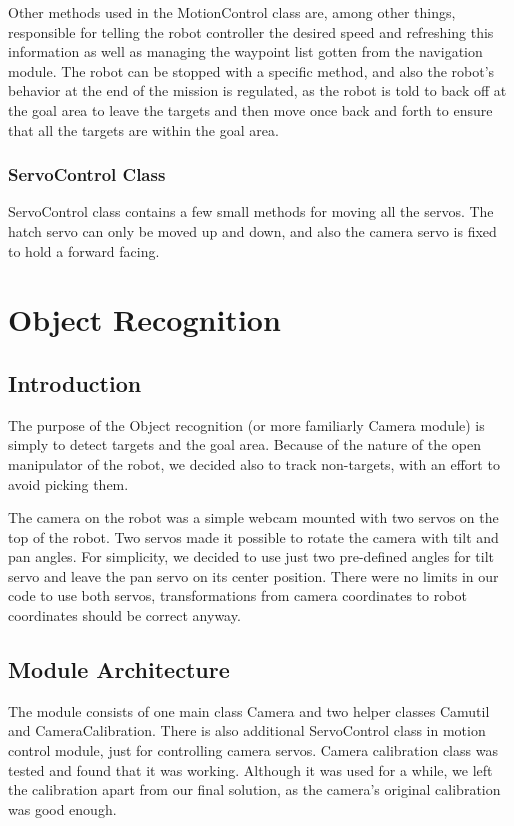 \documentclass[a4paper,10pt]{article}
\begin{document}
Other methods used in the MotionControl class are, among other things, responsible for telling the robot controller the desired speed and refreshing this information as well as managing the waypoint list gotten from the navigation module. The robot can be stopped with a specific method, and also the robot's behavior at the end of the mission is regulated, as the robot is told to back off at the goal area to leave the targets and then move once back and forth to ensure that all the targets are within the goal area.

\subsubsection{ServoControl Class}

ServoControl class contains a few small methods for moving all the servos. The hatch servo can only be moved up and down, and also the camera servo is fixed to hold a forward facing.

\section{Object Recognition}

\subsection{Introduction}

The purpose of the Object recognition (or more familiarly Camera module) is simply to detect targets and the goal area. Because of the nature of the open manipulator of the robot, we decided also to track non-targets, with an effort to avoid picking them.

The camera on the robot was a simple webcam mounted with two servos on the top of the robot. Two servos made it possible to rotate the camera with tilt and pan angles. For simplicity, we decided to use just two pre-defined angles for tilt servo and leave the pan servo on its center position. There were no limits in our code to use both servos, transformations from camera coordinates to robot coordinates should be correct anyway.

\subsection{Module Architecture}

The module consists of one main class Camera and two helper classes Camutil and CameraCalibration. There is also additional ServoControl class in motion control module, just for controlling camera servos. Camera calibration class was tested and found that it was working. Although it was used for a while, we left the calibration apart from our final solution, as the camera's original calibration was good enough.
\end{document}
